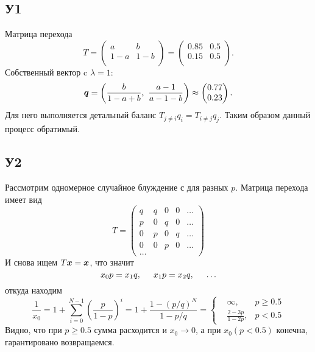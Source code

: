 \subsection{У1}

Матрица перехода
\begin{equation*}
	T = \begin{pmatrix}
	    a & b  \\
	    1-a & 1-b  \\
	\end{pmatrix} = \begin{pmatrix}
	    0.85 & 0.5  \\
	    0.15 & 0.5  \\
	\end{pmatrix}.
\end{equation*}
Собственный вектор c $\lambda=1$:
\begin{equation*}
	\vc{q} = \left(
		\frac{b}{1-a+b},\ 
		\frac{a-1}{a-1-b}
	\right) \approx \begin{pmatrix}
		0.77 \\ 0.23
	\end{pmatrix}.
\end{equation*}
Для него выполняется детальный баланс $T_{j \neq i} q_i = T_{i \neq j} q_j$. Таким образом данный процесс обратимый.



\subsection{У2}

Рассмотрим одномерное случайное блуждение с для разных $p$. Матрица перехода имеет вид
\begin{equation*}
	T = \begin{pmatrix}
		q & q & 0 & 0 & \ldots \\
		p & 0 & q & 0 & \ldots \\
		0 & p & 0 & q & \ldots \\
		0 & 0 & p & 0 & \ldots \\
		\ldots &&&&
	\end{pmatrix}
\end{equation*}
И снова ищем $T \boldsymbol{x} = \boldsymbol{x}$, что значит 
\begin{equation*}
	x_0 p = x_1 q, 
	\hspace{5 mm} 
	x_1 p = x_2 q, 
	\hspace{5 mm} 
	\ldots
\end{equation*}
откуда находим
\begin{equation*}
	\frac{1}{x_0} =
		1 + \sum_{i=0}^{N-1} \left(\frac{p}{1-p}\right)^{i}
	= 1 + \frac{1-(p/q)^{N}}{1-p/q} = \left\{\begin{aligned}
	    &\infty, &p \geq 0.5 \\
	    & \tfrac{2-3p}{1-2p}, &p<0.5
	\end{aligned}\right.
\end{equation*}
Видно, что при $p \geq 0.5$ сумма расходится и $x_0 \to 0$, а при $x_0(p < 0.5)$ конечна, гарантировано возвращаемся. 